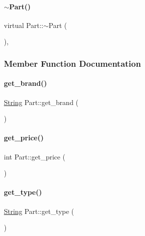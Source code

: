 \mbox{\label{class_part_aaecbb747a7227f7ce3b44caeaf1801c2}} 
\paragraph{\texorpdfstring{$\sim$Part()}{~Part()}}
{\footnotesize\ttfamily virtual Part\+::$\sim$\+Part (\begin{DoxyParamCaption}{ }\end{DoxyParamCaption})\hspace{0.3cm}{\ttfamily [inline]}, {\ttfamily [virtual]}}



\subsubsection{Member Function Documentation}
\mbox{\label{class_part_abdaeb1db5ba55c184f39802c163e9ebc}} 
\paragraph{\texorpdfstring{get\_brand()}{get\_brand()}}
{\footnotesize\ttfamily \mbox{\hyperlink{class_string}{String}} Part\+::get\+\_\+brand (\begin{DoxyParamCaption}{ }\end{DoxyParamCaption})\hspace{0.3cm}{\ttfamily [inline]}}

\mbox{\label{class_part_abb7c8371883825ad46773f219db3523e}} 
\paragraph{\texorpdfstring{get\_price()}{get\_price()}}
{\footnotesize\ttfamily int Part\+::get\+\_\+price (\begin{DoxyParamCaption}{ }\end{DoxyParamCaption})\hspace{0.3cm}{\ttfamily [inline]}}

\mbox{\label{class_part_a97117fd470cd694ae0897fb2f4391786}} 
\paragraph{\texorpdfstring{get\_type()}{get\_type()}}
{\footnotesize\ttfamily \mbox{\hyperlink{class_string}{String}} Part\+::get\+\_\+type (\begin{DoxyParamCaption}{ }\end{DoxyParamCaption})\hspace{0.3cm}{\ttfamily [inline]}}

